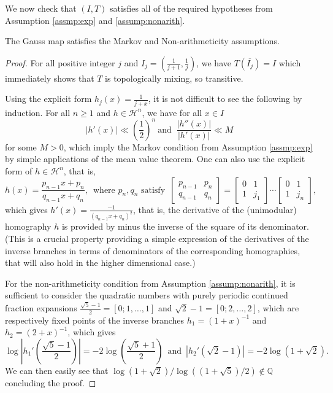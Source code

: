 \documentclass[12pt,a4paper,reqno]{amsart}
\begin{document}
We now check that $(I, T)$ satisfies all of the required hypotheses from Assumption  \ref{assmp:exp} and \ref{assump:nonarith}.


\begin{proposition}
The Gauss map satisfies the Markov  and Non-arithmeticity  assumptions.
\end{proposition}

\begin{proof}
 For all positive integer $j$ and $I_j=(\frac{1}{j+1}, \frac{1}{j})$, we have $T(\overline{I_j})=I$ which immediately shows that $T$ is topologically mixing, so transitive. 

Using the explicit form  $h_j(x)=\frac{1}{j+x}$, it is not difficult to see the following by induction. For all $n \geq 1$ and $h \in \mathcal{H}^n$, we have for all $x \in I$ 
\[ |h'(x)| \ll \left(\frac{1}{2} \right)^n \ \mbox{and } \ \frac{|h''(x)|}{|h'(x)|} \ll M \]
for some $M>0$, which imply the Markov condition from Assumption \ref{assmp:exp} by simple applications of the mean value theorem.
One can also use the explicit form  of $h \in \mathcal{H}^n$, that is, 
\[
h(x)=\frac{p_{n-1}x+p_n}{q_{n-1}x +q_n}, \, \text{ where $p_n, q_n$ satisfy } \, \begin{bmatrix} p_{n-1} & p_n \\ q_{n-1} & q_n \end{bmatrix} =\begin{bmatrix} 0 & 1 \\ 1 & j_1 \end{bmatrix}  \cdots \begin{bmatrix} 0 & 1 \\ 1 & j_n \end{bmatrix},
\] 
which gives  $h'(x)= \frac{-1}{(q_{n-1}x +q_n)^2}$, that is, the derivative of  the (unimodular) homography $h$ is  provided by minus the  inverse of the square of  its  denominator.   (This is  a crucial property providing  a simple expression  of the  derivatives  of  the inverse branches in terms of denominators  of the  corresponding homographies,    that will also hold in the higher dimensional case.)

For the non-arithmeticity condition from Assumption \ref{assump:nonarith},  it is sufficient to consider  the quadratic numbers    with  purely periodic continued  fraction expansions   $ \frac{\sqrt 5-1}{2}= [0;1,\ldots, 1 ]$
and $ \sqrt 2-1= [0;2,\ldots, 2 ]$, which are respectively fixed points of the  inverse branches   $h_1= (1+x)^{-1}$ and $h_2= (2+x)^{-1}$,
which gives 
\[
\log \left| h_1'\left( \frac{\sqrt 5-1}{2}\right)\right|= -2 \log \left(\frac{\sqrt 5+1}{2}\right) \, \text{ and } \,  | h_2'( \sqrt 2-1)|= - 2 \log (1+\sqrt 2).
\]
We can then easily see that $\log  (1+ \sqrt2)/\log ((1+\sqrt 5)/2) \not  \in {\mathbb Q}$ concluding the proof.
\end{proof}
\end{document}
